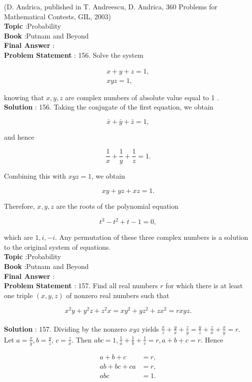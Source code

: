 \documentclass[10pt]{article}
\begin{document}
(D. Andrica, published in T. Andreescu, D. Andrica, 360 Problems for Mathematical Contests, GIL, 2003)
\\
\textbf{Topic} :Probability\\
\textbf{Book} :Putnam and Beyond\\
\textbf{Final Answer} :\\


\textbf{Problem Statement} :
156. Solve the system

$$
\begin{array}{r}
x+y+z=1, \\
x y z=1,
\end{array}
$$

knowing that $x, y, z$ are complex numbers of absolute value equal to 1 .
\\
\textbf{Solution} :
156. Taking the conjugate of the first equation, we obtain

$$
\bar{x}+\bar{y}+\bar{z}=1,
$$

and hence

$$
\frac{1}{x}+\frac{1}{y}+\frac{1}{z}=1 .
$$

Combining this with $x y z=1$, we obtain

$$
x y+y z+x z=1 .
$$

Therefore, $x, y, z$ are the roots of the polynomial equation

$$
t^{3}-t^{2}+t-1=0,
$$

which are $1, i,-i$. Any permutation of these three complex numbers is a solution to the original system of equations.
\\
\textbf{Topic} :Probability\\
\textbf{Book} :Putnam and Beyond\\
\textbf{Final Answer} :\\


\textbf{Problem Statement} :
157. Find all real numbers $r$ for which there is at least one triple $(x, y, z)$ of nonzero real numbers such that

$$
x^{2} y+y^{2} z+z^{2} x=x y^{2}+y z^{2}+z x^{2}=r x y z .
$$
\\
\textbf{Solution} :
157. Dividing by the nonzero $x y z$ yields $\frac{x}{z}+\frac{y}{x}+\frac{z}{y}=\frac{y}{z}+\frac{z}{x}+\frac{x}{y}=r$. Let $a=\frac{x}{y}, b=\frac{y}{z}$, $c=\frac{z}{x}$. Then $a b c=1, \frac{1}{a}+\frac{1}{b}+\frac{1}{c}=r, a+b+c=r$. Hence 

$$
\begin{aligned}
a+b+c &=r, \\
a b+b c+c a &=r, \\
a b c &=1 .
\end{aligned}
$$
\end{document}
